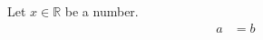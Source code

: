 \documentclass{article}
\begin{document}
Let $x \in \mathbb{R}$ be a number.
\begin{align}
  a &= b
\end{align}
\end{document}
